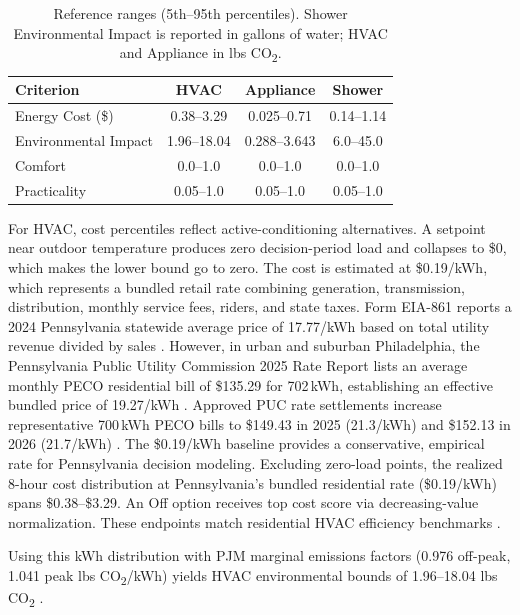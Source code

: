 \documentclass[final,3p,times]{elsarticle}
\begin{document}
\begin{table}[H]
\begin{threeparttable}
\centering
\small
\caption{Reference ranges (5th--95th percentiles). Shower Environmental Impact is reported in gallons of water; HVAC and Appliance in lbs CO\textsubscript{2}.}
\label{table:reference_ranges}
\begin{tabular}{@{}lccc@{}}
\toprule
\textbf{Criterion} & \textbf{HVAC} & \textbf{Appliance} & \textbf{Shower} \\
\midrule
Energy Cost (\$) & 0.38--3.29 & 0.025--0.71 & 0.14--1.14 \\
Environmental Impact & 1.96--18.04 & 0.288--3.643 & 6.0--45.0 \\
Comfort & 0.0--1.0 & 0.0--1.0 & 0.0--1.0 \\
Practicality & 0.05--1.0 & 0.05--1.0 & 0.05--1.0 \\
\bottomrule
\end{tabular}
\end{threeparttable}
\end{table}

For HVAC, cost percentiles reflect active-conditioning alternatives. A setpoint near outdoor temperature produces zero decision-period load and collapses to \$0, which makes the lower bound go to zero. The cost is estimated at \$0.19/kWh, which represents a bundled retail rate combining generation, transmission, distribution, monthly service fees, riders, and state taxes. Form EIA-861 reports a 2024 Pennsylvania statewide average price of 17.77\textcent/kWh based on total utility revenue divided by sales \cite{eia_epa_2024}. However, in urban and suburban Philadelphia, the Pennsylvania Public Utility Commission 2025 Rate Report lists an average monthly PECO residential bill of \$135.29 for 702\,kWh, establishing an effective bundled price of 19.27\textcent/kWh \cite{paupc2025}. Approved PUC rate settlements increase representative 700\,kWh PECO bills to \$149.43 in 2025 (21.3\textcent/kWh) and \$152.13 in 2026 (21.7\textcent/kWh) \cite{paupc2024dec}. The \$0.19/kWh baseline provides a conservative, empirical rate for Pennsylvania decision modeling. Excluding zero-load points, the realized 8-hour cost distribution at Pennsylvania's bundled residential rate (\$0.19/kWh) \cite{eia_epa_2024,paupc2025,paupc2024dec} spans \$0.38--\$3.29.  An Off option receives top cost score via decreasing-value normalization. These endpoints match residential HVAC efficiency benchmarks \cite{synapse2013,parker2018}. 

Using this kWh distribution with PJM marginal emissions factors (0.976 off-peak, 1.041 peak lbs CO\textsubscript{2}/kWh) yields HVAC environmental bounds of 1.96--18.04 lbs CO\textsubscript{2} \cite{pjm2022emissions}. 
\end{document}
